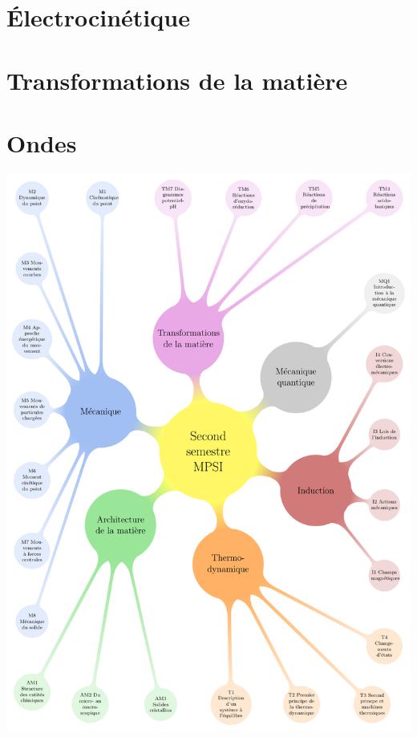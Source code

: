 \documentclass[a4paper, 12pt, garamond]{book}
\begin{document}
\part{Électrocinétique}







\part{Transformations de la matière}



\part{Ondes}



\newpage
\begin{adjustwidth}{-1cm}{-1cm}
	\pagestyle{empty}
	\includegraphics[width=\linewidth]{coverS2}
\end{adjustwidth}
\newpage
\end{document}
